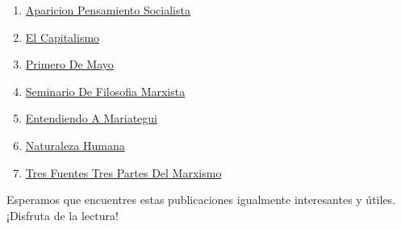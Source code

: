 \documentclass[
  jou,
  floatsintext,
  longtable,
  a4paper,
  nolmodern,
  notxfonts,
  notimes,
  colorlinks=true,linkcolor=blue,citecolor=blue,urlcolor=blue]{apa7}
\providecommand{\tightlist}{%
  \setlength{\itemsep}{0pt}\setlength{\parskip}{0pt}}
\begin{document}
\begin{enumerate}
\def\labelenumi{\arabic{enumi}.}
\tightlist
\item
  \href{https://achalmaedison.netlify.app/filosofia-politica/posts/2018-04-23-aparicion-pensamiento-socialista/index.pdf}{}
  \href{https://achalmaedison.netlify.app/filosofia-politica/posts/2018-04-23-aparicion-pensamiento-socialista}{Aparicion
  Pensamiento Socialista}
\item
  \href{https://achalmaedison.netlify.app/filosofia-politica/posts/2023-03-03-el-capitalismo/index.pdf}{}
  \href{https://achalmaedison.netlify.app/filosofia-politica/posts/2023-03-03-el-capitalismo}{El
  Capitalismo}
\item
  \href{https://achalmaedison.netlify.app/filosofia-politica/posts/2023-04-29-primero-de-mayo/index.pdf}{}
  \href{https://achalmaedison.netlify.app/filosofia-politica/posts/2023-04-29-primero-de-mayo}{Primero
  De Mayo}
\item
  \href{https://achalmaedison.netlify.app/filosofia-politica/posts/2023-05-19-seminario-de-filosofia-marxista/index.pdf}{}
  \href{https://achalmaedison.netlify.app/filosofia-politica/posts/2023-05-19-seminario-de-filosofia-marxista}{Seminario
  De Filosofia Marxista}
\item
  \href{https://achalmaedison.netlify.app/filosofia-politica/posts/2023-06-09-entendiendo-a-mariategui/index.pdf}{}
  \href{https://achalmaedison.netlify.app/filosofia-politica/posts/2023-06-09-entendiendo-a-mariategui}{Entendiendo
  A Mariategui}
\item
  \href{https://achalmaedison.netlify.app/filosofia-politica/posts/2023-06-09-naturaleza-humana/index.pdf}{}
  \href{https://achalmaedison.netlify.app/filosofia-politica/posts/2023-06-09-naturaleza-humana}{Naturaleza
  Humana}
\item
  \href{https://achalmaedison.netlify.app/filosofia-politica/posts/2023-10-23-tres-fuentes-tres-partes-del-marxismo/index.pdf}{}
  \href{https://achalmaedison.netlify.app/filosofia-politica/posts/2023-10-23-tres-fuentes-tres-partes-del-marxismo}{Tres
  Fuentes Tres Partes Del Marxismo}
\end{enumerate}

Esperamos que encuentres estas publicaciones igualmente interesantes y
útiles. ¡Disfruta de la lectura!
\end{document}
